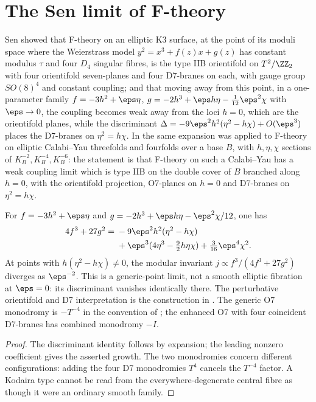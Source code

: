 \section{The Sen limit of F-theory}\label{sec:senlimit}

Sen \cite{Sen96ftheory} showed that F-theory on an elliptic K3 surface, at the point of its moduli space where the Weierstrass model $y^2 = x^3 + f(z)x + g(z)$ has constant modulus $\tau$ and four $D_4$ singular fibres, is the type IIB orientifold on $T^2/\ZZ_2$ with four orientifold seven-planes and four D7-branes on each, with gauge group $SO(8)^4$ and constant coupling; and that moving away from this point, in a one-parameter family $f = -3h^2 + \eps\eta$, $g = -2h^3 + \eps h\eta - \tfrac{1}{12}\eps^2\chi$ with $\eps\to0$, the coupling becomes weak away from the loci $h=0$, which are the orientifold planes, while the discriminant $\Delta = -9\eps^2 h^2(\eta^2 - h\chi) + O(\eps^3)$ places the D7-branes on $\eta^2 = h\chi$. In \cite{Sen97orientifold} the same expansion was applied to F-theory on elliptic Calabi--Yau threefolds and fourfolds over a base $B$, with $h,\eta,\chi$ sections of $K_B^{-2}, K_B^{-4}, K_B^{-6}$: the statement is that F-theory on such a Calabi--Yau has a weak coupling limit which is type IIB on the double cover of $B$ branched along $h=0$, with the orientifold projection, O7-planes on $h=0$ and D7-branes on $\eta^2=h\chi$.

\begin{theorem}\label{thm:senlimitk3}
For $f=-3h^2+\eps\eta$ and $g=-2h^3+\eps h\eta-\eps^2\chi/12$, one has
\begin{align}
4f^3+27g^2={}&-9\eps^2h^2(\eta^2-h\chi)\nonumber\\
&+\eps^3(4\eta^3-\tfrac92h\eta\chi)+\tfrac3{16}\eps^4\chi^2.
\end{align}
At points with $h(\eta^2-h\chi)\ne0$, the modular invariant $j\propto f^3/(4f^3+27g^2)$ diverges as $\eps^{-2}$. This is a generic-point limit, not a smooth elliptic fibration at $\eps=0$: its discriminant vanishes identically there. The perturbative orientifold and D7 interpretation is the construction in \cite{Sen96ftheory,Sen97orientifold}. The generic O7 monodromy is $-T^{-4}$ in the convention of \cite{Sen97orientifold}; the enhanced O7 with four coincident D7-branes has combined monodromy $-I$.
\end{theorem}
\begin{proof}
The discriminant identity follows by expansion; the leading nonzero coefficient gives the asserted growth. The two monodromies concern different configurations: adding the four D7 monodromies $T^4$ cancels the $T^{-4}$ factor. A Kodaira type cannot be read from the everywhere-degenerate central fibre as though it were an ordinary smooth family.
\end{proof}

